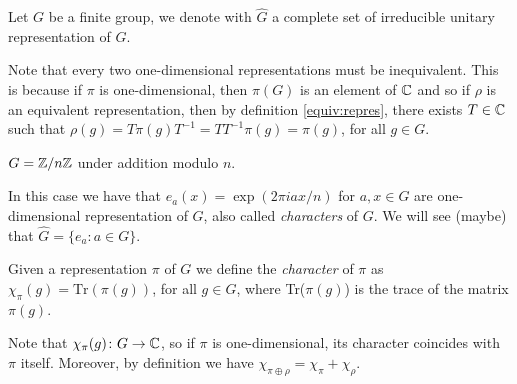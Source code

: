 \begin{defn}
Let $G$ be a finite group, we denote with $\hat{G}$ a complete set of irreducible unitary representation of $G$.
\end{defn}
\begin{rem}
Note that every two one-dimensional representations must be inequivalent. This is because if $\pi$ is one-dimensional, then $\pi(G)$ is an element of ${\mathbb C}$ and so if $\rho$ is an equivalent representation, then by definition \ref{equiv:repres}, there exists $T\in {\mathbb C}$ such that $\rho(g)=T\pi(g) T^{-1} = TT^{-1}\pi(g)=\pi(g)$, for all $g\in G$.
\end{rem}
\begin{exmp}
$G={\mathbb Z}/n{\mathbb Z}$ under addition modulo $n$.

In this case we have that $e_a(x)=\exp(2\pi iax/n)$ for $a,x\in G$ are one-dimensional representation of $G$, also called \emph{characters} of $G$. We will see (maybe) that $\hat{G}=\{e_a\colon a \in G\}$. 
\end{exmp}
\begin{defn}
Given a representation $\pi$ of $G$ we define the \emph{character} of $\pi$ as $\chi_\pi(g)=\text{Tr}(\pi(g))$, for all $g \in G$, where Tr($\pi(g)$) is the trace of the matrix $\pi(g)$.
\end{defn}
\begin{rem}
Note that $\chi_\pi(g)\colon G\rightarrow {\mathbb C}$, so if $\pi$ is one-dimensional, its character coincides with $\pi$ itself. Moreover, by definition we have $\chi_{\pi\oplus\rho}=\chi_{\pi} + \chi_\rho$.
\end{rem}